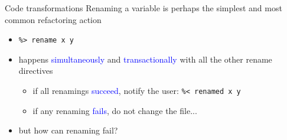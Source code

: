 \documentclass[]{beamer}
\newcommand{\keyword}[1]{\textcolor{blue}{#1}}
\begin{document}
\begin{frame}[fragile]{Code transformations}
Renaming a variable is perhaps the simplest and most common refactoring action\pause
 \begin{itemize}[<+->]
   \item \lstinline|%> rename x y|
   \item happens \keyword{simultaneously} and \keyword{transactionally} with all the other rename directives
   \begin{itemize}
     \item if all renamings \keyword{succeed}, notify the user: \lstinline|%< renamed x y|
     \item if any renaming \keyword{fails}, do not change the file...
   \end{itemize}
   \item but how can renaming fail?
 \end{itemize}
\end{frame}
\end{document}
